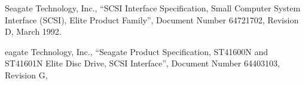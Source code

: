 \begin{thebibliography}{99}






Seagate Technology, Inc.,
``SCSI Interface Specification, Small Computer System Interface (SCSI), Elite
Product Family'',
Document Number 64721702, Revision D, March 1992.

eagate Technology, Inc.,
``Seagate Product Specification, ST41600N and ST41601N Elite Disc Drive, SCSI
Interface'',
Document Number 64403103, Revision G,







\end{thebibliography}
